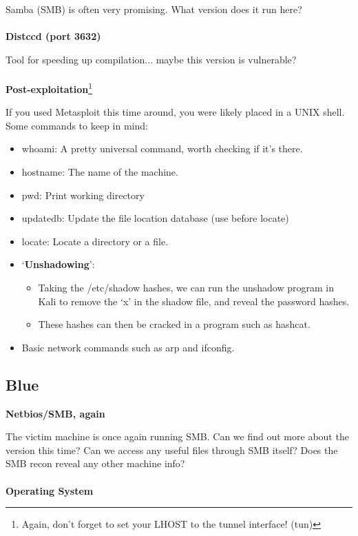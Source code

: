 \documentclass[a4paper,11pt]{article}
\renewcommand{\tt}[2][tt]{\textcolor{#1}{\ttfamily #2}}%
\begin{document}
Samba (SMB) is often very promising. What version does it run here?
\\
\\
{\bfseries Distccd (port 3632)}

Tool for speeding up compilation... maybe this version is vulnerable?
\\
\\
{\bfseries Post-exploitation}\footnote[2]{Again, don't forget to set your LHOST to the tunnel interface! (tun)}

If you used Metasploit this time around, you were likely placed in a UNIX shell. Some commands to keep in mind:
\begin{itemize}
    \item \tt{whoami}: A pretty universal command, worth checking if it's there.
    \item \tt{hostname}: The name of the machine.
    \item \tt{pwd}: Print working directory
    \item \tt{updatedb}: Update the file location database (use before \tt{locate})
    \item \tt{locate}: Locate a directory or a file.
    \item `{\bfseries Unshadowing}':
    \begin{itemize}
        \item Taking the \tt{/etc/shadow} hashes, we can run the \tt{unshadow} program in Kali to remove the `\tt{x}' in the \tt{shadow} file, and reveal the password hashes. 
        \item These hashes can then be cracked in a program such as \tt{hashcat}.
    \end{itemize}
    \item Basic network commands such as \tt{arp} and \tt{ifconfig}.
\end{itemize}
\pagebreak

\begin{center}
\subsection{Blue}
\end{center}

{\bfseries Netbios/SMB, again}

The victim machine is once again running SMB. Can we find out more about the version this time? Can we access any useful files through SMB itself? Does the SMB recon reveal any other machine info?
\\
\\
{\bfseries Operating System}
\end{document}
